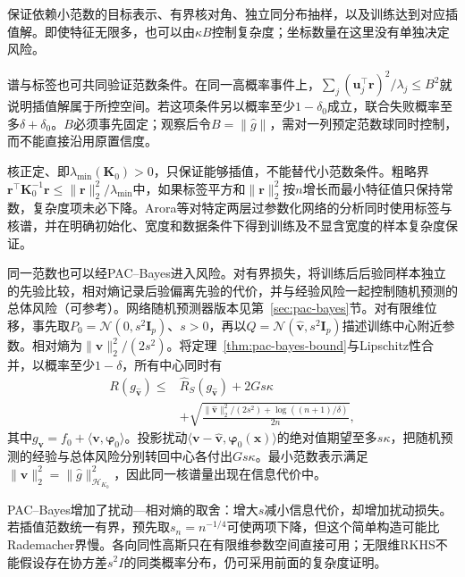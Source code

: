 保证依赖小范数的目标表示、有界核对角、独立同分布抽样，以及训练达到对应插值解。即使特征无限多，也可以由$\kappa B$控制复杂度；坐标数量在这里没有单独决定风险。

谱与标签也可共同验证范数条件。在同一高概率事件上，$\sum_j(\bm u_j^\top\bm r)^2/\lambda_j\leq B^2$就说明插值解属于所控空间。若这项条件另以概率至少$1-\delta_0$成立，联合失败概率至多$\delta+\delta_0$。$B$必须事先固定；观察后令$B=\|\widehat g\|$，需对一列预定范数球同时控制，而不能直接沿用原置信度。

核正定、即$\lambda_{\min}(\bm K_0)>0$，只保证能够插值，不能替代小范数条件。粗略界$\bm r^\top\bm K_0^{-1}\bm r\leq\|\bm r\|_2^2/\lambda_{\min}$中，如果标签平方和$\|\bm r\|_2^2$按$n$增长而最小特征值只保持常数，复杂度项未必下降。Arora等对特定两层过参数化网络的分析同时使用标签与核谱，并在明确初始化、宽度和数据条件下得到训练及不显含宽度的样本复杂度保证。

同一范数也可以经PAC--Bayes进入风险。对有界损失，将训练后后验同样本独立的先验比较，相对熵记录后验偏离先验的代价，并与经验风险一起控制随机预测的总体风险（可参考）。网络随机预测器版本见第~\ref{sec:pac-bayes}节。对有限维位移，事先取$P_0=\mathcal N(0,s^2\bm I_p)$、$s>0$，再以$Q=\mathcal N(\widehat{\bm v},s^2\bm I_p)$描述训练中心附近参数。相对熵为$\|\widehat{\bm v}\|_2^2/(2s^2)$。将定理~\ref{thm:pac-bayes-bound}与Lipschitz性合并，以概率至少$1-\delta$，所有中心同时有
\begin{equation}
 \begin{aligned}
 R(g_{\widehat{\bm v}})\leq{}&\hat R_S(g_{\widehat{\bm v}})+2Gs\kappa\\
 &+\sqrt{\frac{\|\widehat{\bm v}\|_2^2/(2s^2)+\log((n+1)/\delta)}{2n}},
 \end{aligned}
 \label{eq:ntk-pac-bayes-risk}
\end{equation}
其中$g_{\bm v}=f_0+\langle\bm v,\bm\varphi_0\rangle$。投影扰动$\langle\bm v-\widehat{\bm v},\bm\varphi_0(\bm x)\rangle$的绝对值期望至多$s\kappa$，把随机预测的经验与总体风险分别转回中心各付出$Gs\kappa$。最小范数表示满足$\|\widehat{\bm v}\|_2^2=\|\widehat g\|_{\mathcal H_{K_0}}^2$，因此同一核谱量出现在信息代价中。

PAC--Bayes增加了扰动—相对熵的取舍：增大$s$减小信息代价，却增加扰动损失。若插值范数统一有界，预先取$s_n=n^{-1/4}$可使两项下降，但这个简单构造可能比Rademacher界慢。各向同性高斯只在有限维参数空间直接可用；无限维RKHS不能假设存在协方差$s^2I$的同类概率分布，仍可采用前面的复杂度证明。

